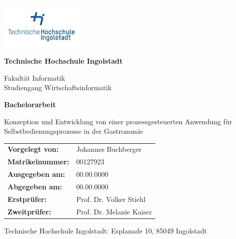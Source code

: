 
\begin{flushright}
    \includegraphics[width=0.3\textwidth]{title-page/thi-logo-head.png}
\end{flushright}

\begin{center}
    \vspace*{1cm}
            
    \huge
    \textbf{Technische Hochschule Ingolstadt}

    \vspace{0.5cm}
    \normalsize
    Fakultät Informatik\\
    Studiengang Wirtschaftsinformatik
    
    \vspace{1.5cm}       
    \huge
    \textbf{Bachelorarbeit}

    \vspace{0.2cm}
    \normalsize
    Konzeption und Entwicklung von einer prozessgesteuerten Anwendung für Selbstbedienungsprozesse in der Gastronomie

    \vspace{2cm}
    
    \begin{table}[h]
        \centering %
        \begin{tabular}{ll}
            \textbf{Vorgelegt von:} & Johannes Buchberger \\
            \textbf{Matrikelnummer:} & 00127923 \\
            \textbf{Ausgegeben am:} & 00.00.0000 \\
            \textbf{Abgegeben am:} & 00.00.0000 \\
            \textbf{Erstprüfer:} & Prof. Dr. Volker Stiehl \\
            \textbf{Zweitprüfer:} & Prof. Dr. Melanie Kaiser
        \end{tabular}
    \end{table}

    \vspace{2cm}
    \large 
    Technische Hochschule Ingolstadt: Esplanade 10, 85049 Ingolstadt
\end{center}
